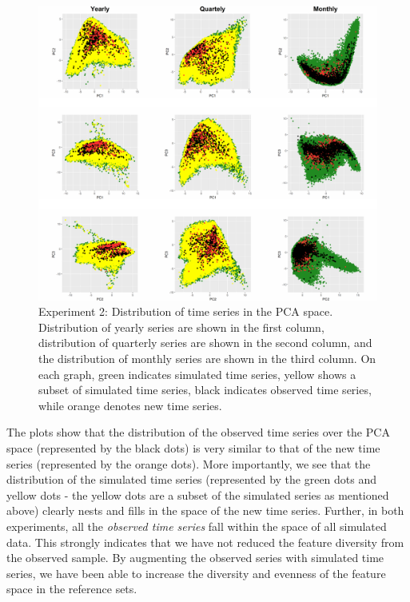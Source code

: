 \documentclass[11pt,a4paper,]{article}
\theoremstyle{definition}
\theoremstyle{definition}
\theoremstyle{definition}
\theoremstyle{remark}
\begin{document}
\begin{figure}

{\centering \includegraphics[width=\textwidth]{figure/exp2pca-1} 

}

\caption{Experiment 2: Distribution of time series in the PCA space. Distribution of yearly series are shown in the first column, distribution of quarterly series are shown in the second column, and the distribution of monthly series are shown in the third column. On each graph, green indicates simulated time series, yellow shows a subset of simulated time series, black indicates observed time series, while orange denotes new time series.}\label{fig:exp2pca}
\end{figure}

The plots show that the distribution of the observed time series over
the PCA space (represented by the black dots) is very similar to that of
the new time series (represented by the orange dots). More importantly,
we see that the distribution of the simulated time series (represented
by the green dots and yellow dots - the yellow dots are a subset of the
simulated series as mentioned above) clearly nests and fills in the
space of the new time series. Further, in both experiments, all the
\emph{observed time series} fall within the space of all simulated data.
This strongly indicates that we have not reduced the feature diversity
from the observed sample. By augmenting the observed series with
simulated time series, we have been able to increase the diversity and
evenness of the feature space in the reference sets.
\end{document}
